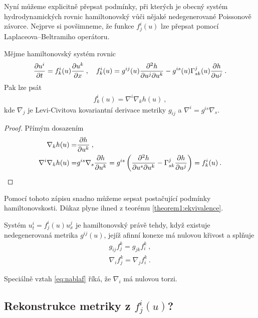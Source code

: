 Nyní můžeme explicitně přepsat podmínky, při kterých je obecný systém hydrodynamických rovnic hamiltonovský vůči nějaké nedegenerované Poissonově závorce. Nejprve si povšimneme, že funkce $f^i_j(u)$ lze přepsat pomocí Laplaceova–Beltramiho operátoru.

\begin{proposition}
    Mějme hamiltonovský systém rovnic
    \begin{align}
        \frac{\partial u^i}{\partial t} = f^i_k(u) \frac{\partial u^k}{\partial x} \:, \quad f^i_k(u) = g^{ij}(u) \frac{\partial^2 h}{\partial u^j \partial u^k} - g^{is}(u) \Gamma^j_{sk}(u) \frac{\partial h}{\partial u^j} \:. \label{eq:hamiltonovsky-system}
    \end{align}
    Pak lze psát 
    \begin{align}
        f^i_k(u) = \nabla^i \nabla_k h(u) \:, 
    \end{align}
    kde $\nabla_j$ je Levi-Civitova kovariantní derivace metriky $g_{ij}$ a $\nabla^i = g^{is} \nabla_s$. 
\end{proposition}
\begin{proof}
    Přímým dosazením
    \begin{align}
        \nabla_k h(u) =& \frac{\partial h}{\partial u^k} \:, \\
        \nabla^i \nabla_k h(u) =& g^{is} \nabla_s \frac{\partial h}{\partial u^k} = g^{is} \left( \frac{\partial^2 h}{\partial u^s \partial u^k} - \Gamma^j_{sk} \frac{\partial h}{\partial u^j} \right) = f^i_k(u) \:.
    \end{align}
\end{proof}

Pomocí tohoto zápisu snadno můžeme sepsat postačující podmínky hamiltonovskosti.
Důkaz plyne ihned z teorému \vref{theorem1:ekvivalence}.

\begin{theorem}
    Systém $u^i_t = f^i_j(u) u^j_x$ je hamiltonovský právě tehdy, když existuje nedegenerovaná metrika $g^{ij}(u)$, jejíž afinní konexe má nulovou křivost a splňuje
    \begin{align}
        g_{ij} f^k_j = g_{jk} f^k_i \:, \label{eq:gf=gf} \\
        \nabla_i f^k_j = \nabla_j f^k_i \label{eq:nablaf} \:.
    \end{align}
\end{theorem}

Speciálně vztah \eqref{eq:nablaf} říká, že $\nabla_i$ má nulovou torzi.


\subsection{Rekonstrukce metriky z $f^i_j(u)$?}

